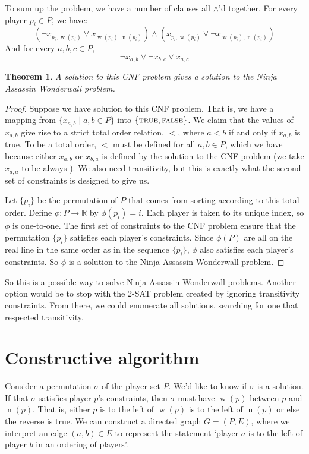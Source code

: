 \documentclass[12pt,x11names, rgb]{article}
\newtheorem*{thm}{Theorem}
\DeclareMathOperator{\w}{w}
\DeclareMathOperator{\n}{n}
\begin{document}
    To sum up the problem, we have a number of clauses all $\wedge$'d together. For every player $p_i \in P$, we have:
\[
	(\lnot x_{p_i, \w(p_i)} \vee x_{\w(p_i), \n(p_i)}) \wedge (x_{p_i, \w(p_i)} \vee \lnot x_{\w(p_i), \n(p_i)})
\]
	And for every $a,b,c \in P$, 
\[
	\lnot x_{a,b} \vee \lnot x_{b,c} \vee x_{a,c}
\]
	\vspace{12pt}
	\begin{thm} A solution to this CNF problem gives a solution to the Ninja Assassin Wonderwall problem. 
	\end{thm}
    \begin{proof}
    Suppose we have solution to this CNF problem. That is, we have a mapping from $\{x_{a,b} \mid a,b \in P\}$ into $\{\textnormal{\scshape true}, \textnormal{\scshape false}\}$. We claim that the values of $x_{a,b}$ give rise to a strict total order relation, $<$, where $a<b$ if and only if $x_{a,b}$ is true. To be a total order, $<$ must be defined for all $a,b \in P$, which we have because either $x_{a,b}$ or $x_{b,a}$ is defined by the solution to the CNF problem (we take $x_{a,a}$ to be always ). We also need transitivity, but this is exactly what the second set of constraints is designed to give us.

    Let $\{p_i\}$ be the permutation of $P$ that comes from sorting according to this total order. Define $\phi: P \to \mathbb{R}$ by $\phi(p_i) = i$. Each player is taken to its unique index, so $\phi$ is one-to-one. The first set of constraints to the CNF problem ensure that the permutation $\{p_i\}$ satisfies each player's constraints. Since $\phi(P)$ are all on the real line in the same order as in the sequence $\{p_i\}$, $\phi$ also satisfies each player's constraints. So $\phi$ is a solution to the Ninja Assassin Wonderwall problem.
    
    \end{proof}

    So this is a possible way to solve Ninja Assassin Wonderwall problems. Another option would be to stop with the 2-SAT problem created by ignoring transitivity constraints. From there, we could enumerate all solutions, searching for one that respected transitivity. %

\section{Constructive algorithm}
    \label{sec:algorithm}
    Consider a permutation $\sigma$ of the player set $P$. We'd like to know if $\sigma$ is a solution. If that $\sigma$ satisfies player $p$'s constraints, then $\sigma$ must have $\w(p)$ between $p$ and $\n(p)$. That is, either $p$ is to the left of $\w(p)$ is to the left of $\n(p)$ or else the reverse is true. We can construct a directed graph $G=(P,E)$, where we interpret an edge $(a,b) \in E$ to represent the statement `player $a$ is to the left of player $b$ in an ordering of players'. 
\end{document}
